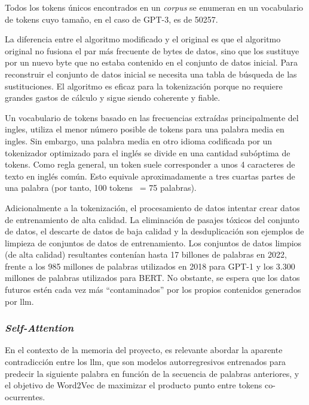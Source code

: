 Todos los tokens únicos encontrados en un \textit{corpus} se enumeran en un vocabulario de tokens cuyo tamaño, en el caso de GPT-3, es de 50257.

La diferencia entre el algoritmo modificado y el original es que el algoritmo original no fusiona el par más frecuente de bytes de datos, sino que los sustituye por un nuevo byte que no estaba contenido en el conjunto de datos inicial. Para reconstruir el conjunto de datos inicial se necesita una tabla de búsqueda de las sustituciones. El algoritmo es eficaz para la tokenización porque no requiere grandes gastos de cálculo y sigue siendo coherente y fiable.


Un vocabulario de tokens basado en las frecuencias extraídas principalmente del ingles, utiliza el menor número posible de tokens para una palabra media en ingles. Sin embargo, una palabra media en otro idioma codificada por un tokenizador optimizado para el inglés se divide en una cantidad subóptima de tokens. Como regla general, un token suele corresponder a unos 4 caracteres de texto en inglés común. Esto equivale aproximadamente a tres cuartas partes de una palabra (por tanto, 100 tokens ~= 75 palabras).

Adicionalmente a la tokenización, el procesamiento de datos intentar crear datos de entrenamiento de alta calidad. La eliminación de pasajes tóxicos del conjunto de datos, el descarte de datos de baja calidad y la desduplicación son ejemplos de limpieza de conjuntos de datos de entrenamiento. Los conjuntos de datos limpios (de alta calidad) resultantes contenían hasta 17 billones de palabras en 2022, frente a los 985 millones de palabras utilizados en 2018 para GPT-1 y los 3.300 millones de palabras utilizados para BERT. No obstante, se espera que los datos futuros estén cada vez más ``contaminados'' por los propios contenidos generados por \acrshort{llm}.

\subsubsection{\textit{Self-Attention}}

En el contexto de la memoria del proyecto, es relevante abordar la aparente contradicción entre los \acrfull{llm}, que son modelos autorregresivos entrenados para predecir la siguiente palabra en función de la secuencia de palabras anteriores, y el objetivo de Word2Vec de maximizar el producto punto entre tokens co-ocurrentes.

